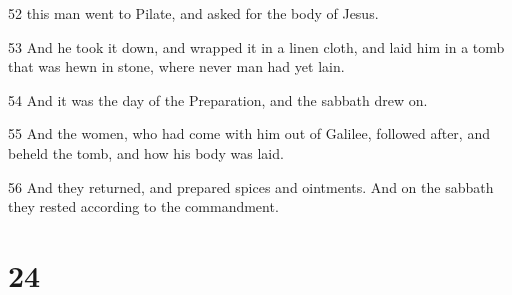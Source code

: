 \par 52 this man went to Pilate, and asked for the body of Jesus.
\par 53 And he took it down, and wrapped it in a linen cloth, and laid him in a tomb that was hewn in stone, where never man had yet lain.
\par 54 And it was the day of the Preparation, and the sabbath drew on.
\par 55 And the women, who had come with him out of Galilee, followed after, and beheld the tomb, and how his body was laid.
\par 56 And they returned, and prepared spices and ointments. And on the sabbath they rested according to the commandment.

\chapter{24}

